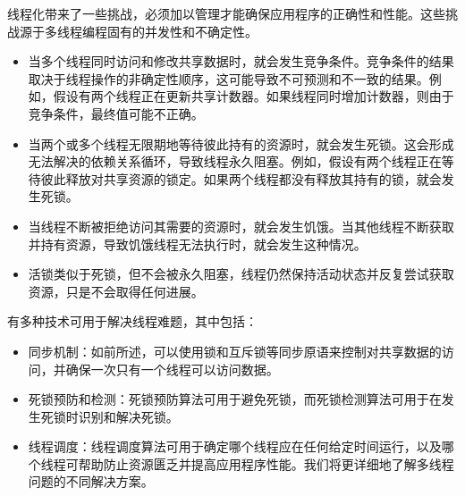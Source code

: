 线程化带来了一些挑战，必须加以管理才能确保应用程序的正确性和性能。这些挑战源于多线程编程固有的并发性和不确定性。

\begin{itemize}
\item
当多个线程同时访问和修改共享数据时，就会发生竞争条件。竞争条件的结果取决于线程操作的非确定性顺序，这可能导致不可预测和不一致的结果。例如，假设有两个线程正在更新共享计数器。如果线程同时增加计数器，则由于竞争条件，最终值可能不正确。

\item
当两个或多个线程无限期地等待彼此持有的资源时，就会发生死锁。这会形成无法解决的依赖关系循环，导致线程永久阻塞。例如，假设有两个线程正在等待彼此释放对共享资源的锁定。如果两个线程都没有释放其持有的锁，就会发生死锁。

\item
当线程不断被拒绝访问其需要的资源时，就会发生饥饿。当其他线程不断获取并持有资源，导致饥饿线程无法执行时，就会发生这种情况。

\item
活锁类似于死锁，但不会被永久阻塞，线程仍然保持活动状态并反复尝试获取资源，只是不会取得任何进展。
\end{itemize}

有多种技术可用于解决线程难题，其中包括：

\begin{itemize}
\item
同步机制：如前所述，可以使用锁和互斥锁等同步原语来控制对共享数据的访问，并确保一次只有一个线程可以访问数据。

\item
死锁预防和检测：死锁预防算法可用于避免死锁，而死锁检测算法可用于在发生死锁时识别和解决死锁。

\item
线程调度：线程调度算法可用于确定哪个线程应在任何给定时间运行，以及哪个线程可帮助防止资源匮乏并提高应用程序性能。我们将更详细地了解多线程问题的不同解决方案。
\end{itemize}

















